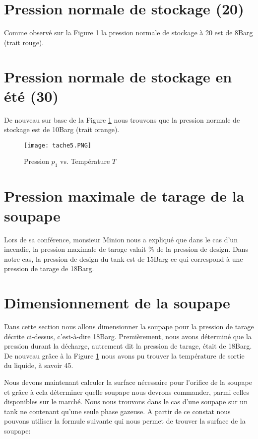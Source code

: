 
\section{Pression normale de stockage (\unit{20}{\celsius})}

Comme observé sur la Figure \ref{graph1} la pression normale de stockage à \unit{20}{\celsius} est de \unit{8}{Barg} (trait rouge).

\section{Pression normale de stockage en été (\unit{30}{\celsius})}

De nouveau sur base de la Figure \ref{graph1} nous trouvons que la pression normale de stockage est de \unit{10}{Barg} (trait orange).

\begin{figure}[ht!]
\centering
\texttt{[image: tache5.PNG]}
\caption{Pression $p_1$ vs. Température $T$}
\label{graph1}
\end{figure}

\section{Pression maximale de tarage de la soupape}

Lors de sa conférence, monsieur Minion nous a expliqué que dans le cas d'un incendie, la pression maximale de tarage valait  \% de la pression de design. Dans notre cas, la pression de design du tank est de \unit{15}{Barg} ce qui correspond à une pression de tarage de \unit{18}{Barg}.

\section{Dimensionnement de la soupape}

Dans cette section nous allons dimensionner la soupape pour la pression de tarage décrite ci-dessus, c'est-à-dire \unit{18}{Barg}.
Premièrement, nous avons déterminé que la pression durant la décharge, autrement dit la pression de tarage, était de \unit{18}{Barg}. De nouveau grâce à la Figure \ref{graph1} nous avons pu trouver la température de sortie du liquide, à savoir \unit{45}{\celsius}.

Nous devons maintenant calculer la surface nécessaire pour l'orifice de la soupape et grâce à cela déterminer quelle soupape nous devrons commander, parmi celles disponibles sur le marché. Nous nous trouvons dans le cas d'une soupape sur un tank ne contenant qu'une seule phase gazeuse. A partir de ce constat nous pouvons utiliser la formule suivante qui nous permet de trouver la surface de la soupape:


